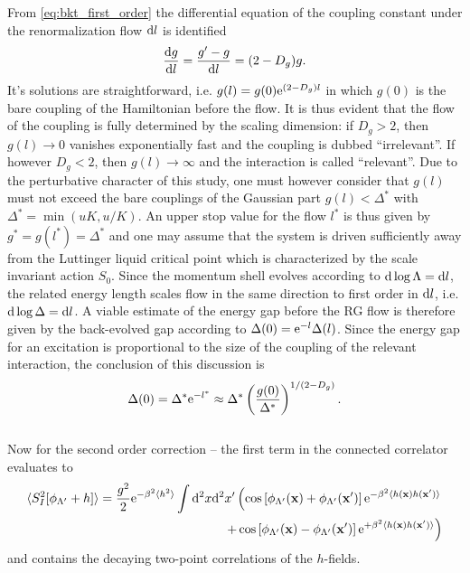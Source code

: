 From \cref{eq:bkt_first_order} the differential equation of the coupling constant under the renormalization flow $\mathrm d l$ is identified
\begin{align}
    \frac{\mathrm d g}{\mathrm d l} = \frac{g'-g}{\mathrm d l} = (2-D_g)g.
\end{align}
It's solutions are straightforward, i.e. $g(l) = g(0)\mathrm e^{(2-D_g)l}$ in which $g(0)$ is the bare coupling of the Hamiltonian before the flow.
It is thus evident that the flow of the coupling is fully determined by the scaling dimension: if $D_g>2$, then $g(l)\rightarrow0$ vanishes exponentially fast and the coupling is dubbed ``irrelevant''.
If however $D_g<2$, then $g(l)\rightarrow\infty$ and the interaction is called ``relevant''.
Due to the perturbative character of this study, one must however consider that $g(l)$ must not exceed the bare couplings of the Gaussian part $g(l)<\Delta^*$ with $\Delta^*=\min(uK,u/K)$.
An upper stop value for the flow $l^*$ is thus given by $g^*=g(l^*)=\Delta^*$ and one may assume that the system is driven sufficiently away from the Luttinger liquid critical point which is characterized by the scale invariant action $S_0$.
Since the momentum shell evolves according to $\mathrm d\log\Lambda=\mathrm d l$, the related energy length scales flow in the same direction to first order in $\mathrm d l$, i.e. $\mathrm d\log\Delta = \mathrm d l$.
A viable estimate of the energy gap before the RG flow is therefore given by the back-evolved gap according to $\Delta(0)=\mathrm e^{-l}\Delta(l)$.
Since the energy gap for an excitation is proportional to the size of the coupling of the relevant interaction, the conclusion of this discussion is
\begin{align}
    \Delta(0) = \Delta^*\mathrm e^{-l^*} \approx \Delta^*\left( \frac{g(0)}{\Delta^*} \right)^{1/(2-D_g)}.
\end{align}
\\
Now for the second order correction -- the first term in the connected correlator evaluates to
\begin{align}
    \braket{S^2_I[\phi_{\Lambda'}+h]}=\frac{g^2}2\mathrm e^{-\beta^2\braket{h^2}}\int\mathrm d^2x\mathrm d^2x'
    \left(
        \cos\left[ \phi_{\Lambda'}({\bf x})+\phi_{\Lambda'}({\bf x'}) \right]\mathrm e^{-\beta^2\braket{h({\bf x})h({\bf x'})}}
        \right.\\
        \left.+
        \cos\left[ \phi_{\Lambda'}({\bf x})-\phi_{\Lambda'}({\bf x'}) \right]\mathrm e^{+\beta^2\braket{h({\bf x})h({\bf x'})}}
    \right)
    \label{eq:second_order_rg_term1}
\end{align}
and contains the decaying two-point correlations of the $h$-fields.
